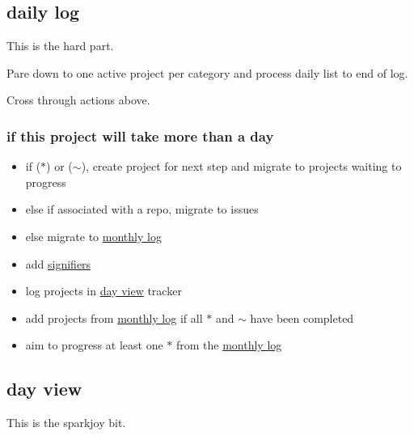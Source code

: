 \documentclass[]{book}
\begin{document}
\hypertarget{dayview:daily-log}{%
\subsection{daily log}\label{dayview:daily-log}}

This is the hard part.

Pare down to one active project per category and process daily list to end of log.

Cross through actions above.

\hypertarget{if-this-project-will-take-more-than-a-day}{%
\subsubsection{if this project will take more than a day}\label{if-this-project-will-take-more-than-a-day}}

\begin{itemize}
\item
  if (\(*\)) or (\(\sim\)), create project for next step and migrate to projects waiting to progress
\item
  else if associated with a repo, migrate to issues
\item
  else migrate to \protect\hyperlink{monthly-log}{monthly log}
\item
  add \protect\hyperlink{signifiers}{signifiers}
\item
  log projects in \protect\hyperlink{day-view}{day view} tracker
\item
  add projects from \protect\hyperlink{monthly-log}{monthly log} if all \(*\) and \(\sim\) have been completed
\item
  aim to progress at least one \(*\) from the \protect\hyperlink{monthly-log}{monthly log}
\end{itemize}

\hypertarget{day-view}{%
\subsection{day view}\label{day-view}}

This is the sparkjoy bit.
\end{document}
